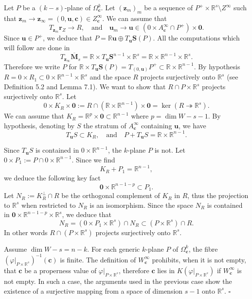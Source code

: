 \documentclass[11pt]{article}
\begin{document}
Let $P$ be a $(k-s)$-plane of $\Omega_{\mathbf c}^k$. Let $(\mathbf z_m)_m$ be a sequence of
$P^{+}\times\mathbb R^s\setminus Z^{\infty}$ such that
$\mathbf z_m\to\mathbf z_{\infty} = (0,\mathbf u,\mathbf c)\in Z_{\mathbf c}^{\infty}$. We can assume
that
\[
T_{\mathbf z_m}\mathbf r_Z \longrightarrow R, \quad\text{and}\quad
\mathbf u_m\longrightarrow\mathbf u\in(0\times A_{\mathbf c}^{\infty}\cap P^{+})\times\mathbf 0 .
\]
Since $\mathbf u\in P^{+}$, we deduce that $P = \mathbb R\mathbf u\oplus T_{\mathbf u}\mathbf S(P)$.
All the computations which will follow are done in
\[
T_{\mathbf z_{\infty}}\overline{\mathbf M}_s
= \mathbb R\times T_{\mathbf u}\mathbf S^{n-1}\times\mathbb R^s = \mathbb R\times\mathbb R^{n-1}\times\mathbb R^s .
\]
Therefore we write $P$ for $\mathbb R\times T_{\mathbf u}\mathbf S(P) = T_{(0,\mathbf u)}P^{+}
\subset\mathbb R\times\mathbb R^{n-1}$. By hypothesis $R = 0\times R_1\subset 0\times\mathbb R^{n-1}
\times\mathbb R^s$ and the space $R$ projects surjectively onto $\mathbb R^s$ (see Definition 5.2 and
Lemma 7.1). We want to show that $R\cap P\times\mathbb R^s$ projects surjectively onto $\mathbb R^s$.
Let
\[
0\times K_R\times\mathbf 0 := R\cap(\mathbb R\times\mathbb R^{n-1})\times\mathbf 0
= \ker(R\twoheadrightarrow\mathbb R^s).
\]
We can assume that $K_R = \mathbb R^p\times\mathbf 0\subset\mathbb R^{n-1}$ where $p = \dim W-s-1$.
By hypothesis, denoting by $S$ the stratum of $A_{\mathbf c}^{\infty}$ containing $\mathbf u$, we have
\[
T_{\mathbf u}S\subset K_R, \quad\text{and}\quad P+T_{\mathbf u}S = \mathbb R\times\mathbb R^{n-1}.
\]

Since $T_{\mathbf u}S$ is contained in $0\times\mathbb R^{n-1}$, the $k$-plane $P$ is not. Let
$0\times P_1 := P\cap 0\times\mathbb R^{n-1}$. Since we find
\[
K_R + P_1 = \mathbb R^{n-1},
\]
we deduce the following key fact
\[
\mathbf 0\times\mathbb R^{n-1-p}\subset P_1 .
\]
Let $N_R := K_R^{\perp}\cap R$ be the orthogonal complement of $K_R$ in $R$, thus the projection to
$\mathbb R^s$ when restricted to $N_R$ is an isomorphism. Since the space $N_R$ is contained in
$\mathbf 0\times\mathbb R^{n-1-p}\times\mathbb R^s$, we deduce that
\[
N_R = (0\times P_1\times\mathbb R^s)\cap N_R\subset(P\times\mathbb R^s)\cap R .
\]
In other words $R\cap(P\times\mathbb R^s)$ projects surjectively onto $\mathbb R^s$.

Assume $\dim W-s = n-k$. For each generic $k$-plane $P$ of $\Omega_{\mathbf c}^k$, the fibre
$(\varphi|_{P\times\mathbb R^s})^{-1}(\mathbf c)$ is finite. The definition of
$W_{\mathbf c}^{\infty}$ prohibits, when it is not empty, that $\mathbf c$ be a properness value of
$\varphi|_{P\times\mathbb R^s}$, therefore $\mathbf c$ lies in $K(\varphi|_{P\times\mathbb R^s})$ if
$W_{\mathbf c}^{\infty}$ is not empty. In such a case, the arguments used in the previous case show the
existence of a surjective mapping from a space of dimension $s-1$ onto $\mathbb R^s$.
\hfill$\square$
\end{document}

